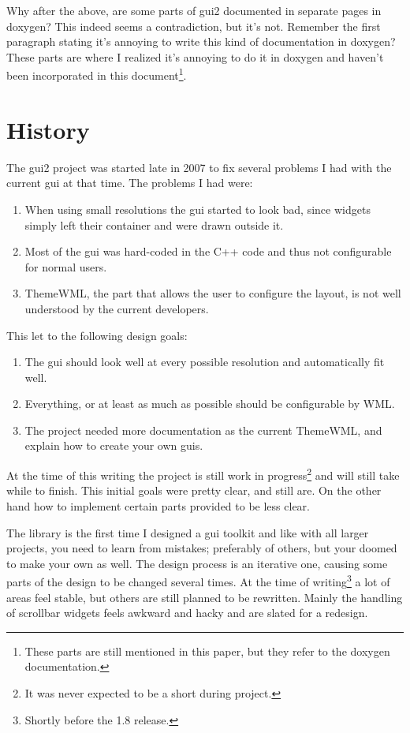 Why after the above, are some parts of gui2 documented in separate pages in
doxygen? This indeed seems a contradiction, but it's not. Remember the first
paragraph stating it's annoying to write this kind of documentation in doxygen?
These parts are where I realized it's annoying to do it in doxygen and haven't
been incorporated in this document\footnote{These parts are still mentioned in
this paper, but they refer to the doxygen documentation.}.

\section{History}

The gui2 project was started late in 2007 to fix several problems I had with the
current gui at that time. The problems I had were:
\begin{enumerate}
\item When using small resolutions the gui started to look bad, since widgets
	simply left their container and were drawn outside it.
\item Most of the gui was hard-coded in the C++ code and thus not configurable
	for normal users.
\item ThemeWML, the part that allows the user to configure the layout, is not
	well understood by the current developers.
\end{enumerate}

This let to the following design goals:

\begin{enumerate}
\item The gui should look well at every possible resolution and automatically
	fit well.
\item Everything, or at least as much as possible should be configurable by WML.
\item The project needed more documentation as the current ThemeWML, and explain
	how to create your own guis.
\end{enumerate}

At the time of this writing the project is still work in progress\footnote{It
was never expected to be a short during project.} and will still take while to
finish. This initial goals were pretty clear, and still are. On the other hand
how to implement certain parts provided to be less clear.

The library is the first time I designed a gui toolkit and like with all larger
projects, you need to learn from mistakes; preferably of others, but your doomed
to make your own as well. The design process is an iterative one, causing some
parts of the design to be changed several times. At the time of
writing\footnote{Shortly before the 1.8 release.} a lot of areas feel stable,
but others are still planned to be rewritten. Mainly the handling of scrollbar
widgets feels awkward and hacky and are slated for a redesign.


